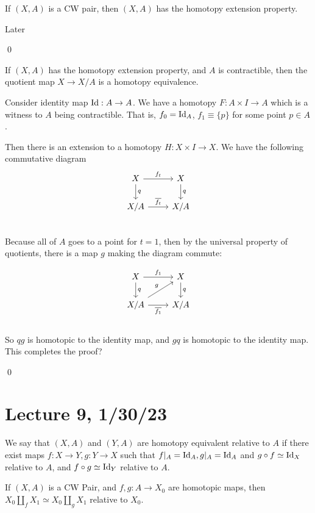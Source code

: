\documentclass[x11names,reqno,14pt]{extarticle}
\begin{document}
\prop 

If $(X, A)$ is a CW pair, then $(X, A)$ has the homotopy extension property. 

\proof

Later

\qed

\thm 

If $(X, A)$ has the homotopy extension property, and $A$ is contractible, then the quotient map $X \to X/A$ is a homotopy equivalence. 

\proof

Consider identity map $\operatorname{\mathrm{Id}}:A\to A$. We have a homotopy $F:A\times I \to A$ which is a witness to $A$ being contractible. That is, $f_0 = \operatorname{\mathrm{Id}}_A$, $f_1 \equiv \{p\}$ for some point $p \in A$. 

Then there is an extension to a homotopy $H:X\times I \to X$. We have the following commutative diagram
\[
\begin{tikzcd}
X\ar[r, "f_t"] \ar[d, "q"] & X \ar[d, "q"] \\
X/A \ar[r, "\bar{f_t}"] & X/A \\
\end{tikzcd}
\]
Because all of $A$ goes to a point for $t = 1$, then by the universal property of quotients, there is a map $g$ making the diagram commute:

\[
\begin{tikzcd}
X\ar[r, "f_1"] \ar[d, "q"] & X \ar[d, "q"] \\
X/A \ar[ur, "g"]\ar[r, "\bar{f_1}"'] & X/A \\
\end{tikzcd}
\]
So $qg$ is homotopic to the identity map, and $gq$ is homotopic to the identity map. This completes the proof? 

\qed

\section*{Lecture 9, 1/30/23}


We say that $(X, A)$ and $(Y, A)$ are homotopy equivalent relative to $A$ if there exist maps $f:X\to Y, g:Y\to X$ such that $f|_A = \operatorname{\mathrm{Id}}_A, g|_A = \operatorname{\mathrm{Id}}_A$ and $g \circ f \simeq \operatorname{\mathrm{Id}}_X$ relative to $A$, and $f \circ g \simeq \operatorname{\mathrm{Id}}_Y$ relative to $A$. 

\thm

If $(X, A)$ is a CW Pair, and $f, g:A\to X_0$ are homotopic maps, then $X_0 \coprod_fX_1 \simeq X_0\coprod_gX_1$ relative to $X_0$. 
\end{document}
